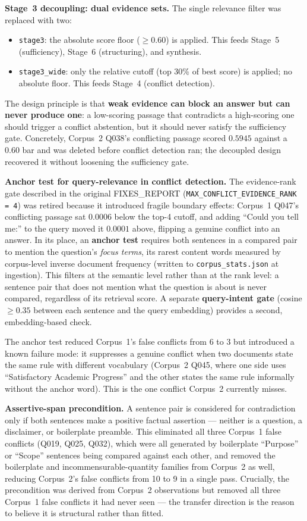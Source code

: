 \documentclass[conference]{IEEEtran}
\begin{document}
\textbf{Stage~3 decoupling: dual evidence sets.} The single relevance
filter was replaced with two:
\begin{itemize}
  \item \texttt{stage3}: the absolute score floor ($\geq 0.60$) is
    applied. This feeds Stage~5 (sufficiency), Stage~6 (structuring),
    and synthesis.
  \item \texttt{stage3\_wide}: only the relative cutoff (top 30\% of
    best score) is applied; no absolute floor. This feeds Stage~4
    (conflict detection).
\end{itemize}
The design principle is that \textbf{weak evidence can block an answer
but can never produce one}: a low-scoring passage that contradicts a
high-scoring one should trigger a conflict abstention, but it should
never satisfy the sufficiency gate. Concretely, Corpus~2 Q038's
conflicting passage scored $0.5945$ against a $0.60$ bar and was
deleted before conflict detection ran; the decoupled design recovered it
without loosening the sufficiency gate.

\textbf{Anchor test for query-relevance in conflict detection.} The
evidence-rank gate described in the original FIXES\_REPORT
(\texttt{MAX\_CONFLICT\_EVIDENCE\_RANK\,=\,4}) was retired because it
introduced fragile boundary effects: Corpus~1 Q047's conflicting
passage sat $0.0006$ below the top-4 cutoff, and adding ``Could you
tell me:'' to the query moved it $0.0001$ above, flipping a genuine
conflict into an answer. In its place, an \textbf{anchor test} requires
both sentences in a compared pair to mention the question's
\textit{focus terms}, its rarest content words measured by corpus-level
inverse document frequency (written to \texttt{corpus\_stats.json} at
ingestion). This filters at the semantic level rather than at the rank
level: a sentence pair that does not mention what the question is about
is never compared, regardless of its retrieval score. A separate
\textbf{query-intent gate} (cosine $\geq 0.35$ between each sentence
and the query embedding) provides a second, embedding-based check.

The anchor test reduced Corpus~1's false conflicts from 6 to 3 but
introduced a known failure mode: it suppresses a genuine conflict when
two documents state the same rule with different vocabulary
(Corpus~2 Q045, where one side uses ``Satisfactory Academic Progress''
and the other states the same rule informally without the anchor word).
This is the one conflict Corpus~2 currently misses.


\textbf{Assertive-span precondition.}
A sentence pair is considered for contradiction only if both sentences
make a positive factual assertion — neither is a question, a disclaimer,
or boilerplate preamble. This eliminated all three Corpus~1 false
conflicts (Q019, Q025, Q032), which were all generated by boilerplate
``Purpose'' or ``Scope'' sentences being compared against each other,
and removed the boilerplate and incommensurable-quantity families from
Corpus~2 as well, reducing Corpus~2's false conflicts from 10 to 9 in
a single pass. Crucially, the precondition was derived from Corpus~2
observations but removed all three Corpus~1 false conflicts it had
never seen — the transfer direction is the reason to believe it is
structural rather than fitted.
\end{document}
